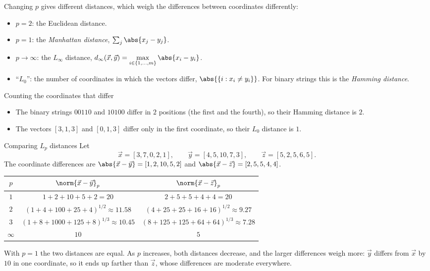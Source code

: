 \documentclass[a4paper,12pt,oneside]{report}
\begin{document}
Changing $p$ gives different distances, which weigh the differences
between coordinates differently:
\begin{itemize}
  \item $p=2$: the Euclidean distance.
  \item $p=1$: the \emph{Manhattan distance},
    $\sum_j\abs{x_j-y_j}$.
  \item $p\to\infty$: the $L_\infty$ distance,
    $\displaystyle d_\infty(\vec x,\vec y)
      =\max_{i\in\{1,\ldots,m\}}\abs{x_i-y_i}$.
  \item ``$L_0$'': the number of coordinates in which the vectors
    differ, $\abs{\{i:x_i\neq y_i\}}$. For binary strings this is the
    \emph{Hamming distance}.
\end{itemize}

\begin{framedexample}{Counting the coordinates that differ}
\label{ex:hamming}
\begin{itemize}
  \item The binary strings $00110$ and $10100$ differ in $2$ positions
    (the first and the fourth), so their Hamming distance is $2$.
  \item The vectors $[3,1,3]$ and $[0,1,3]$ differ only in the first
    coordinate, so their $L_0$ distance is $1$.
\end{itemize}
\end{framedexample}

\begin{framedexample}{Comparing $L_p$ distances}\label{ex:lp-distances}
Let
\[
  \vec x=[3,7,0,2,1],\qquad
  \vec y=[4,5,10,7,3],\qquad
  \vec z=[5,2,5,6,5].
\]
The coordinate differences are $\abs{\vec x-\vec y}=[1,2,10,5,2]$ and
$\abs{\vec x-\vec z}=[2,5,5,4,4]$.
\begin{center}
\begin{tabular}{ccc}
  \toprule
  $p$ & $\norm{\vec x-\vec y}_p$ & $\norm{\vec x-\vec z}_p$\\
  \midrule
  $1$ & $1+2+10+5+2=20$ & $2+5+5+4+4=20$\\
  $2$ & $(1+4+100+25+4)^{1/2}\approx11.58$
      & $(4+25+25+16+16)^{1/2}\approx9.27$\\
  $3$ & $(1+8+1000+125+8)^{1/3}\approx10.45$
      & $(8+125+125+64+64)^{1/3}\approx7.28$\\
  $\infty$ & $10$ & $5$\\
  \bottomrule
\end{tabular}
\end{center}
With $p=1$ the two distances are equal. As $p$ increases, both
distances decrease, and the larger differences weigh more: $\vec y$
differs from $\vec x$ by $10$ in one coordinate, so it ends up farther
than $\vec z$, whose differences are moderate everywhere.
\end{framedexample}
\end{document}
